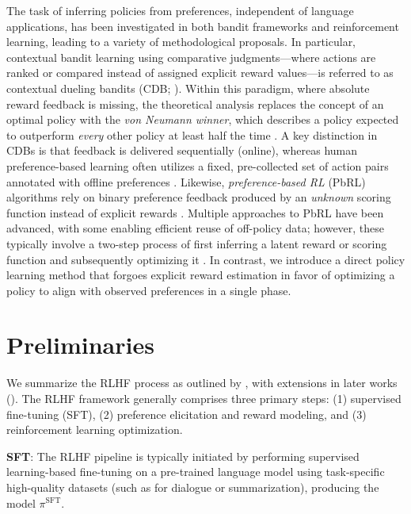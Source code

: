 The task of inferring policies from preferences, independent of language applications, has been investigated in both bandit frameworks and reinforcement learning, leading to a variety of methodological proposals. In particular, contextual bandit learning using comparative judgments—where actions are ranked or compared instead of assigned explicit reward values—is referred to as contextual dueling bandits (CDB; \cite{yue2012karmed,dudik2015contextual}). Within this paradigm, where absolute reward feedback is missing, the theoretical analysis replaces the concept of an optimal policy with the \textit{von Neumann winner}, which describes a policy expected to outperform \textit{every} other policy at least half the time \citep{dudik2015contextual}. A key distinction in CDBs is that feedback is delivered sequentially (online), whereas human preference-based learning often utilizes a fixed, pre-collected set of action pairs annotated with offline preferences \citep{yan2022human}. Likewise, \textit{preference-based RL} (PbRL) algorithms rely on binary preference feedback produced by an \textit{unknown} scoring function instead of explicit rewards \citep{BusaFekete2014,ruiz2023dueling}. Multiple approaches to PbRL have been advanced, with some enabling efficient reuse of off-policy data; however, these typically involve a two-step process of first inferring a latent reward or scoring function and subsequently optimizing it \citep{jain2013learning,BusaFekete2014,christiano2017deep,sadigh2017active,kupcsik2018learning}. In contrast, we introduce a direct policy learning method that forgoes explicit reward estimation in favor of optimizing a policy to align with observed preferences in a single phase.

\section{Preliminaries}\label{section:prelims}

We summarize the RLHF process as outlined by \citeauthor{ziegler2020finetuning}, with extensions in later works (\citep{stiennon2022learning, bai2022training, ouyang2022training}). The RLHF framework generally comprises three primary steps: (1) supervised fine-tuning (SFT), (2) preference elicitation and reward modeling, and (3) reinforcement learning optimization.

\textbf{SFT}: The RLHF pipeline is typically initiated by performing supervised learning-based fine-tuning on a pre-trained language model using task-specific high-quality datasets (such as for dialogue or summarization), producing the model $\pi^\text{SFT}$.

